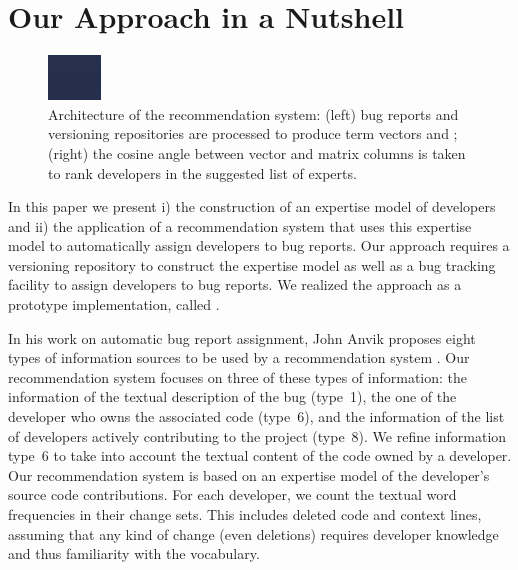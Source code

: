 \documentclass[10pt]{book}
\begin{document}
\section{Our Approach in a Nutshell}\label{sec:nutshell}

\begin{figure}
    \includegraphics[width=\linewidth]{FlowOfAlgo}
    \caption{Architecture of the \TOOL recommendation system: (left) bug reports and versioning repositories are processed to produce term vectors and \TAMS; (right) the cosine angle between vector and matrix columns is taken to rank developers in the suggested list of experts.}
    \label{fig:algo}
\end{figure} 

In this paper we present i) the construction of an expertise model of developers and ii) the application of a recommendation system that uses this expertise model to automatically assign developers to bug reports. Our approach requires a versioning repository to construct the expertise model as well as a bug tracking facility to assign developers to bug reports. We realized the approach as a prototype implementation, called \TOOL.

In his work on automatic bug report assignment, John Anvik proposes eight types of information sources to be used by a recommendation system \cite{Anvi06b}. Our recommendation system focuses on three of these types of information: the information of the textual description of the bug (type~1), the one of the developer who owns the associated code (type~6), and the information of the list of developers actively contributing to the project (type~8). We refine information type~6 to take into account the textual content of the code owned by a developer. Our recommendation system is based on an expertise model of the developer's source code contributions. For each developer, we count the textual word frequencies in their change sets. This includes deleted code and context lines, assuming that any kind of change (even deletions) requires developer knowledge and thus familiarity with the vocabulary. 
\end{document}
